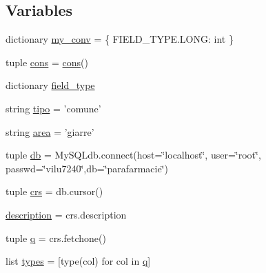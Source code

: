 \subsection*{Variables}
\begin{DoxyCompactItemize}
\item 
dictionary \hyperlink{namespacemmasgis_1_1testquerytype_add59df84ba27b1f13d5c8cd04a508a93}{my\_\-conv} = \{ FIELD\_\-TYPE.LONG: int \}
\item 
tuple \hyperlink{namespacemmasgis_1_1testquerytype_a0a6b3907a5d2aa5f9ed920af8ddee1f3}{cons} = \hyperlink{namespacemmasgis_1_1testquerytype_a0a6b3907a5d2aa5f9ed920af8ddee1f3}{cons}()
\item 
dictionary \hyperlink{namespacemmasgis_1_1testquerytype_a2177e37b08c45fefce43557ea482df02}{field\_\-type}
\item 
string \hyperlink{namespacemmasgis_1_1testquerytype_af5ec20ce98eba724a388ca9bdf17af90}{tipo} = 'comune'
\item 
string \hyperlink{namespacemmasgis_1_1testquerytype_a2e593d719a194dc926a878eaa33846e1}{area} = 'giarre'
\item 
tuple \hyperlink{namespacemmasgis_1_1testquerytype_ab8ef45525ef14f1438ad57168a1419e7}{db} = MySQLdb.connect(host=\char`\"{}localhost\char`\"{}, user=\char`\"{}root\char`\"{}, passwd=\char`\"{}vilu7240\char`\"{},db=\char`\"{}parafarmacie\char`\"{})
\item 
tuple \hyperlink{namespacemmasgis_1_1testquerytype_a55ad3e8b85eed65ed1b5353795fecbd3}{crs} = db.cursor()
\item 
\hyperlink{namespacemmasgis_1_1testquerytype_aad7162e1d4ef85960e8f2982616b3db1}{description} = crs.description
\item 
tuple \hyperlink{namespacemmasgis_1_1testquerytype_af8b1b02c5ffcbeb1566fa0592598074f}{q} = crs.fetchone()
\item 
list \hyperlink{namespacemmasgis_1_1testquerytype_a9a0064269538b713487fc7407e3478ab}{types} = \mbox{[}type(col) for col in \hyperlink{namespacemmasgis_1_1testquerytype_af8b1b02c5ffcbeb1566fa0592598074f}{q}\mbox{]}
\end{DoxyCompactItemize}


